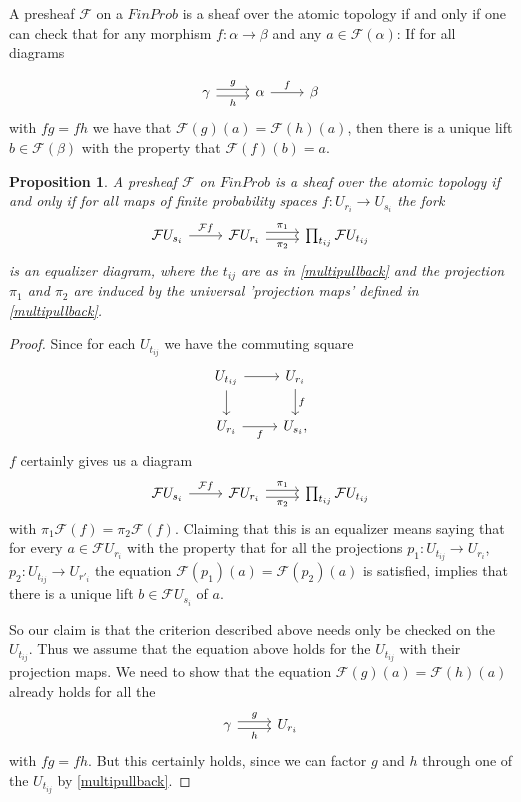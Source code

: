 \documentclass[a4paper]{amsproc}
\theoremstyle{plain}
\newtheorem{proposition}[theorem]{Proposition}
\theoremstyle{definition}
\theoremstyle{remark}
\numberwithin{equation}{section}
\begin{document}
A presheaf $\mathcal{F}$ on a $FinProb$ is a sheaf over the atomic topology if and only if one can check that for any morphism $f: \alpha \to \beta$ and any $a \in \mathcal{F}(\alpha)$: If for all diagrams

\[
\begin{tikzcd}
\gamma \arrow[r, "g", shift left] \arrow[r, "h"', shift right] & \alpha \arrow[r, "f"] & \beta
\end{tikzcd}
\]
with $f g = f h$ we have that $\mathcal{F}(g)(a) = \mathcal{F}(h)(a)$, then there is a unique lift $b \in \mathcal{F}(\beta)$ with the property that $\mathcal{F}(f)(b) = a$.

\begin{proposition} \label{sheaf_condition}
A presheaf $\mathcal{F}$ on $FinProb$ is a sheaf over the atomic topology if and only if for all maps of finite probability spaces $f: U_{r_i} \to U_{s_i}$ the fork
\[
\begin{tikzcd}
\mathcal{F} U_{s_i} \arrow[r, "\mathcal{F}f"] & 
\mathcal{F} U_{r_i} \arrow[r, "\pi_1", shift left] \arrow[r, "\pi_2"', shift right] & \prod_{t_{ij}} \mathcal{F} U_{t_{ij}}
\end{tikzcd}
\]
is an equalizer diagram, where the $t_{ij}$ are as in \ref{multipullback} and the projection $\pi_1$ and $\pi_2$ are induced by the universal 'projection maps' defined in \ref{multipullback}.
\end{proposition}
\begin{proof}
Since for each $U_{t_{ij}}$ we have the commuting square
\[
\begin{tikzcd}
U_{t_{ij}} \arrow[r] \arrow[d] & {U_{r_i}} \arrow[d, "f"] \\
{U_{r_i}} \arrow[r, "f"']            & {U_{s_i}} ,
\end{tikzcd}
\]
$f$ certainly gives us a diagram
\[
\begin{tikzcd}
\mathcal{F} U_{s_i} \arrow[r, "\mathcal{F}f"] & \mathcal{F} U_{r_i} \arrow[r, "\pi_1", shift left] \arrow[r, "\pi_2"', shift right] & \prod_{t_{ij}} \mathcal{F} U_{t_{ij}}
\end{tikzcd}
\]
with $\pi_1 \mathcal{F}(f) = \pi_2 \mathcal{F}(f)$. Claiming that this is an equalizer means saying that for every $a \in \mathcal{F}U_{r_i}$ with the property that for all the projections $p_1: U_{t_{ij}} \to U_{r_i}$, $p_2: U_{t_{ij}} \to U_{r'_i}$ the equation $\mathcal{F}(p_1)(a) = \mathcal{F}(p_2)(a)$ is satisfied, implies that there is a unique lift $b \in \mathcal{F}U_{s_i}$ of $a$.

So our claim is that the criterion described above needs only be checked on the $U_{t_{ij}}$. Thus we assume that the equation above holds for the $U_{t_{ij}}$ with their projection maps. We need to show that the equation $\mathcal{F}(g)(a) = \mathcal{F}(h)(a)$ already holds for all the \[
\begin{tikzcd}
\gamma \arrow[r, "g", shift left] \arrow[r, "h"', shift right] & U_{r_i}
\end{tikzcd}
\]
with $fg = fh$. But this certainly holds, since we can factor $g$ and $h$ through one of the $U_{t_{ij}}$ by \ref{multipullback}.
\end{proof}
\end{document}
